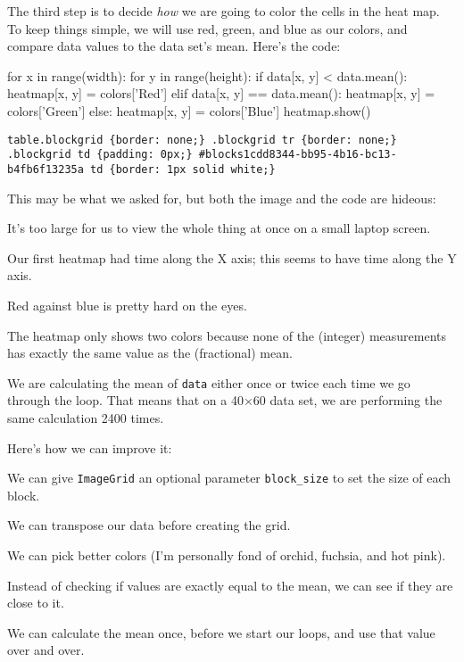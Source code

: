 \documentclass{book}
\begin{document}
The third step is to decide \emph{how} we are going to color the cells
in the heat map. To keep things simple, we will use red, green, and blue
as our colors, and compare data values to the data set's mean. Here's
the code:

\begin{VerbIn}
for x in range(width):
    for y in range(height):
        if data[x, y] < data.mean():
            heatmap[x, y] = colors['Red']
        elif data[x, y] == data.mean():
            heatmap[x, y] = colors['Green']
        else:
            heatmap[x, y] = colors['Blue']
heatmap.show()
\end{VerbIn}

\begin{Verbatim}
table.blockgrid {border: none;} .blockgrid tr {border: none;} .blockgrid td {padding: 0px;} #blocks1cdd8344-bb95-4b16-bc13-b4fb6f13235a td {border: 1px solid white;}
\end{Verbatim}

This may be what we asked for, but both the image and the code are
hideous:

\begin{swcenumerate}
\item
  It's too large for us to view the whole thing at once on a small
  laptop screen.
\item
  Our first heatmap had time along the X axis; this seems to have time
  along the Y axis.
\item
  Red against blue is pretty hard on the eyes.
\item
  The heatmap only shows two colors because none of the (integer)
  measurements has exactly the same value as the (fractional) mean.
\item
  We are calculating the mean of \texttt{data} either once or twice each
  time we go through the loop. That means that on a 40×60 data set, we
  are performing the same calculation 2400 times.
\end{swcenumerate}

Here's how we can improve it:

\begin{swcenumerate}
\item
  We can give \texttt{ImageGrid} an optional parameter
  \texttt{block\_size} to set the size of each block.
\item
  We can transpose our data before creating the grid.
\item
  We can pick better colors (I'm personally fond of orchid, fuchsia, and
  hot pink).
\item
  Instead of checking if values are exactly equal to the mean, we can
  see if they are close to it.
\item
  We can calculate the mean once, before we start our loops, and use
  that value over and over.
\end{swcenumerate}
\end{document}
